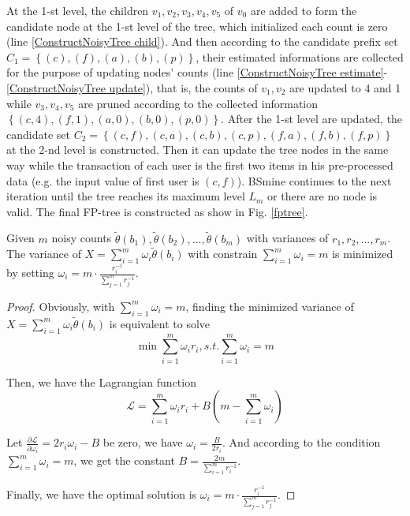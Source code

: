 \documentclass[conference]{IEEEtran}
\begin{document}
At the 1-st level, the children $v_1,v_2,v_3,v_4,v_5$ of $v_0$ are added to form the candidate node at the 1-st level of the tree, which initialized each count is zero (line \ref{ConstructNoisyTree child}). And then according to the candidate prefix set $C_1 = \left\{ (c),(f),(a),(b),(p) \right\}$, their estimated informations are collected for the purpose of updating nodes' counts (line \ref{ConstructNoisyTree estimate}-\ref{ConstructNoisyTree update}), that is, the counts of $v_1,v_2$ are updated to 4 and 1 while $v_3,v_4,v_5$ are pruned according to the collected information $\left\{ (c,4),(f,1),(a,0),(b,0),(p,0) \right\}$. After the 1-st level are updated, the candidate set $C_2 = \left\{ (c,f),(c,a),(c,b),(c,p),(f,a),(f,b),(f,p) \right\}$ at the 2-nd level is constructed. Then it can update the tree nodes in the same way while the transaction of each user is the first two items in his pre-processed data (e.g. the input value of first user  is $(c,f)$). BSmine continues to the next iteration until the tree reaches its maximum level $L_m$ or there are no node is valid. The final FP-tree is constructed as show in Fig. \ref{fptree}.


\begin{theorem}\label{minimized noisy count}
Given $m$ noisy counts $\tilde{\theta}(b_1),\tilde{\theta}(b_2),...,\tilde{\theta}(b_m)$ with variances of $r_1,r_2,...,r_m$. The variance of $X = \sum_{i=1}^{m}\omega_i\tilde{\theta}(b_i)$ with constrain $\sum_{i=1}^{m}\omega_i = m$ is minimized by setting $\omega_i = m \cdot \frac{r_i^{-1} }{\sum_{j=1}^{m} r_j^{-1}}$.
\end{theorem}

\newtheorem*{proof}{}
\begin{proof}
Obviously, with $\sum_{i=1}^{m}\omega_i = m$, finding the minimized variance of $X = \sum_{i=1}^{m}\omega_i\tilde{\theta}(b_i)$ is equivalent to solve
\begin{equation}
\min{\sum_{i=1}^{m}\omega_i r_i , s.t. \sum_{i=1}^{m}\omega_i = m } \label{weigh mine}
\end{equation}

Then, we have the Lagrangian function
$$\mathcal{L} = \sum_{i=1}^{m}\omega_i r_i + B(m - \sum_{i=1}^{m}\omega_i)$$

Let $\frac{\partial {\mathcal{L}}}{ \partial{\omega_i}} = 2r_i \omega_i - B$ be zero, we have $\omega_i = \frac{B}{2r_i}$. And according to the condition $\sum_{i=1}^{m}\omega_i = m$, we get the constant $B = \frac{2m}{\sum_{i=1}^{m} r_i^{-1}}$.

Finally, we have the optimal solution is $\omega_i = m \cdot \frac{r_i^{-1} }{\sum_{j=1}^{m} r_j^{-1}}$.

\end{proof}
\end{document}
